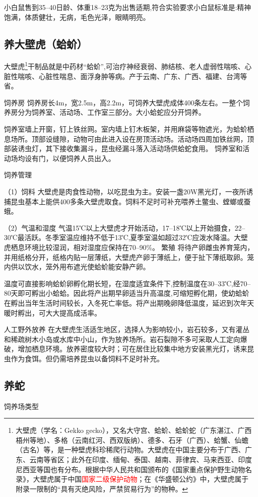 \documentclass{ctexbook}
\begin{document}
小白鼠售到35--40日龄、体重18--23克为出售适期,符合实验要求小白鼠标准是:精神饱满，体质健壮，无病，毛色光泽，眼睛明亮。
\subsection{养大壁虎（蛤蚧）}
大壁虎\footnote{大壁虎（学名：Gekko gecko），又名大守宫、蛤蚧、蛤蚧蛇（广东湛江、广西梧州等地）、多格（云南红河、西双版纳）、德多、石牙（广西）、蛤蟹、仙蟾（古名）等，是一种壁虎科珍稀爬行动物。大壁虎在中国主要分布于广西、广东、云南等省区；此外在印度、缅甸、泰国、越南、菲律宾、马来西亚、印度尼西亚等国也有分布。根据中华人民共和国颁布的《国家重点保护野生动物名录》，大壁虎属于中国\textcolor{red}{国家二级保护动物}；在《华盛顿公约》中，大壁虎属于附录一限制的“具有灭绝风险，严禁贸易行为”的物种。}干制品就是中药材“蛤蚧”,可治疗神经衰弱、肺结核、老人虚弱性喘咳、心脏性喘咳、心脏性喘息、面浮身肿等病。产于云南、广东、广西、福建、台湾等省。

饲养房 饲养房长4m，宽2.5m，高2.2m，可饲养大壁虎成体400条左右。一整个饲养房分为饲养室、活动场、工作室三部分。大小蛤蛇应分开饲养。

饲养室墙上开窗，钉上铁丝网。室内墙上钉木板架，并用麻袋等物遮光，为蛤蚧栖息场所。顶部设缝隙，动物可由此进入设在房顶活动场。活动场四周加铁丝网，顶部装诱虫灯，其下接收集漏斗，昆虫经漏斗落入活动场供蛤蛇食用。 饲养室和活动场均设有门，以便饲养人员出入。

饲养管理

（1）饲料 大壁虎是肉食性动物，以吃昆虫为主。安装一盏20W黑光灯，一夜所诱捕昆虫基本上能供400多条大壁虎取食。饲料不足时可补充喂养土鳖虫、螳螂或蚕蛾。

（2）气温和湿度 气温15℃以上大壁虎才开始活动，17--18℃以上开始摄食，22--30℃最活跃。冬季室温应维持不低于13℃,夏季室温如超过32℃应泼水降温。大壁虎栖息环境比较湿润，相对湿度应保持在70--90\%。
繁殖 将待产卵雌虫养育笼内，并用纸格分开，纸格内贴一层薄纸，大壁虎产卵于薄纸上，便于扯下薄纸取卵。笼内供以饮水，笼外用布遮光使蛤蚧能安静产卵。

温度可直接影响蛤蚧卵孵化期长短，在湿度适宜条件下,控制温度在30--33℃,经70--80天即可孵出小蛤蛤。因此将产出期早卵适当升高温度,可缩短孵化期，使幼蛤蚧在孵出当年生活时间较长，入冬死亡率低。将产出期晚卵降低温度，延迟到次年天暖时孵出，可大大提高成活率。

人工野外放养 在大壁虎生活适生地区，选择人为影响较小，岩石较多，又有灌丛和稀疏树木小岛或水库中小山，作为放养场所。岩石裂隙不多可采取人工定向爆破，增加栖息环境。放养密度较大时；可在居住比较集中地方安装黑光灯，诱来昆虫作为食饵。但仍需培养昆虫以备饲料不足时补充。
\subsection{养蛇}
饲养场类型 
\end{document}
